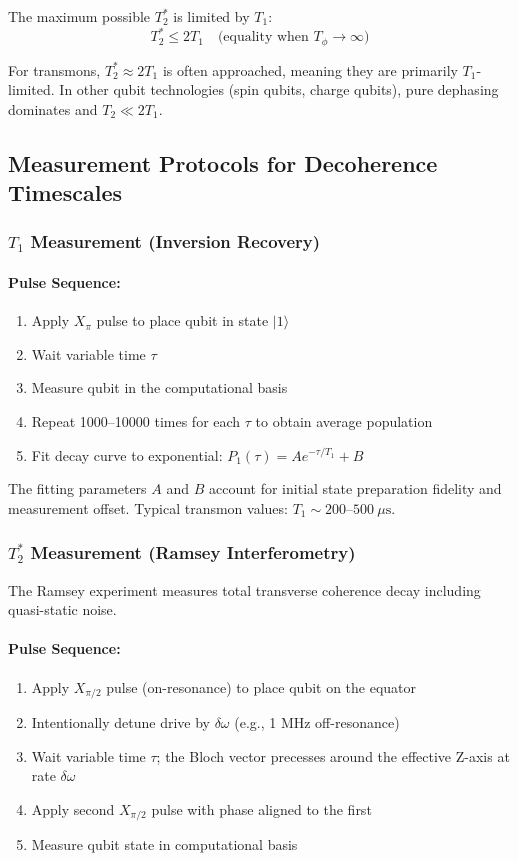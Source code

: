 \documentclass{article}
\begin{document}
The maximum possible $T_2^*$ is limited by $T_1$:
$$T_2^* \leq 2T_1 \quad \text{(equality when } T_\phi \to \infty \text{)}$$

For transmons, $T_2^* \approx 2T_1$ is often approached, meaning they are primarily $T_1$-limited. In other qubit technologies (spin qubits, charge qubits), pure dephasing dominates and $T_2 \ll 2T_1$.

\subsection{Measurement Protocols for Decoherence Timescales}

\subsubsection*{$T_1$ Measurement (Inversion Recovery)}

\paragraph{Pulse Sequence:}
\begin{enumerate}
    \item Apply $X_\pi$ pulse to place qubit in state $|1\rangle$
    \item Wait variable time $\tau$
    \item Measure qubit in the computational basis
    \item Repeat 1000--10000 times for each $\tau$ to obtain average population
    \item Fit decay curve to exponential: $P_1(\tau) = A e^{-\tau/T_1} + B$
\end{enumerate}

The fitting parameters $A$ and $B$ account for initial state preparation fidelity and measurement offset. Typical transmon values: $T_1 \sim 200$--$500~\mu\text{s}$.

\subsubsection*{$T_2^*$ Measurement (Ramsey Interferometry)}

The Ramsey experiment measures total transverse coherence decay including quasi-static noise.

\paragraph{Pulse Sequence:}
\begin{enumerate}
    \item Apply $X_{\pi/2}$ pulse (on-resonance) to place qubit on the equator
    \item Intentionally detune drive by $\delta\omega$ (e.g., 1 MHz off-resonance)
    \item Wait variable time $\tau$; the Bloch vector precesses around the effective Z-axis at rate $\delta\omega$
    \item Apply second $X_{\pi/2}$ pulse with phase aligned to the first
    \item Measure qubit state in computational basis
\end{enumerate}
\end{document}
